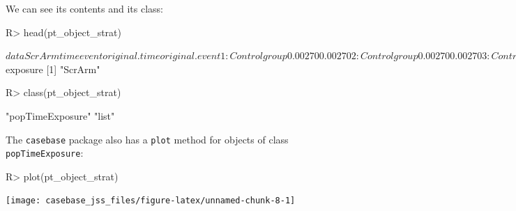 \documentclass[article]{jss}
\begin{document}
We can see its contents and its class:

\begin{CodeChunk}

\begin{CodeInput}
R> head(pt_object_strat)
\end{CodeInput}

\begin{CodeOutput}
$data
                 ScrArm    time event original.time original.event
     1:   Control group  0.0027     0        0.0027              0
     2:   Control group  0.0027     0        0.0027              0
     3:   Control group  0.0027     0        0.0027              0
     4:   Control group  0.0027     0        0.0027              0
     5:   Control group  0.0137     0        0.0137              0
    ---                                                           
159889: Screening group 14.9405     0       14.9405              0
159890: Screening group 14.9405     0       14.9405              0
159891: Screening group 14.9405     0       14.9405              0
159892: Screening group 14.9405     0       14.9405              0
159893: Screening group 14.9405     0       14.9405              0
        event status ycoord yc n_available
     1:     censored  88232  0           0
     2:     censored  88231  0           0
     3:     censored  88230  0           0
     4:     censored  88229  0           0
     5:     censored  88228  0           0
    ---                                   
159889:     censored      5  0           0
159890:     censored      4  0           0
159891:     censored      3  0           0
159892:     censored      2  0           0
159893:     censored      1  0           0

$exposure
[1] "ScrArm"
\end{CodeOutput}

\begin{CodeInput}
R> class(pt_object_strat)
\end{CodeInput}

\begin{CodeOutput}
[1] "popTimeExposure" "list"           
\end{CodeOutput}
\end{CodeChunk}

The \texttt{casebase} package also has a \texttt{plot} method for
objects of class \texttt{popTimeExposure}:

\begin{CodeChunk}

\begin{CodeInput}
R> plot(pt_object_strat)
\end{CodeInput}


\begin{center}\texttt{[image: casebase\_jss\_files/figure-latex/unnamed-chunk-8-1]} \end{center}

\end{CodeChunk}
\end{document}
